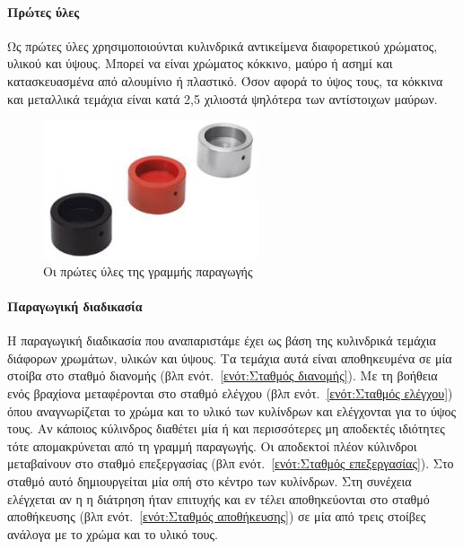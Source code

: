 \documentclass[a4paper,12pt,twoside]{report}
\begin{document}
{			\paragraph{Πρώτες ύλες} {Ως πρώτες ύλες χρησιμοποιούνται κυλινδρικά αντικείμενα διαφορετικού χρώματος, υλικού και ύψους. Μπορεί να είναι χρώματος κόκκινο, μαύρο ή ασημί και κατασκευασμένα από αλουμίνιο ή πλαστικό. Όσον αφορά το ύψος τους, τα κόκκινα και μεταλλικά τεμάχια είναι κατά 2,5 χιλιοστά ψηλότερα των αντίστοιχων μαύρων.
			}
			
			\begin{figure}[hp]
					\centering
					\includegraphics[scale=0.25]{WorkpiecesFesto.png}
					\caption{Οι πρώτες ύλες της γραμμής παραγωγής}
					\label{φωτ:Οι πρώτες ύλες της γραμμής παραγωγής}
			\end{figure}
		
			\paragraph{Παραγωγική διαδικασία} {Η παραγωγική διαδικασία που αναπαριστάμε έχει ως βάση της κυλινδρικά τεμάχια διάφορων χρωμάτων, υλικών και ύψους. Τα τεμάχια αυτά είναι αποθηκευμένα σε μία στοίβα στο σταθμό διανομής {\footnotesize (βλπ ενότ.~\ref{ενότ:Σταθμός διανομής})}. Με τη βοήθεια ενός βραχίονα μεταφέρονται στο σταθμό ελέγχου {\footnotesize (βλπ ενότ.~\ref{ενότ:Σταθμός ελέγχου})} όπου αναγνωρίζεται το χρώμα και το υλικό των κυλίνδρων και ελέγχονται για το ύψος τους. Αν κάποιος κύλινδρος διαθέτει μία ή και περισσότερες μη αποδεκτές ιδιότητες τότε απομακρύνεται από τη γραμμή παραγωγής. Οι αποδεκτοί πλέον κύλινδροι μεταβαίνουν στο σταθμό επεξεργασίας {\footnotesize (βλπ ενότ.~\ref{ενότ:Σταθμός επεξεργασίας})}. Στο σταθμό αυτό δημιουργείται μία οπή στο κέντρο των κυλίνδρων. Στη συνέχεια ελέγχεται αν η η διάτρηση ήταν επιτυχής και εν τέλει αποθηκεύονται στο σταθμό αποθήκευσης {\footnotesize (βλπ ενότ.~\ref{ενότ:Σταθμός αποθήκευσης})} σε μία από τρεις στοίβες ανάλογα με το χρώμα και το υλικό τους. \cite{UMLΕνσωματωμέναΣυστήματα}
			}
			
}
\end{document}

